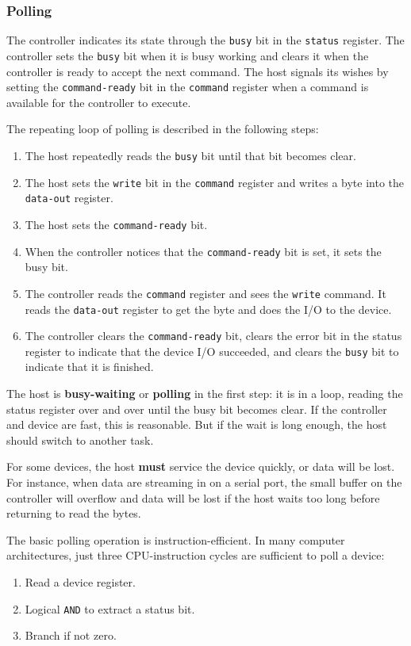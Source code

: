 \subsubsection{Polling}\label{subsubsec:Polling}
The controller indicates its state through the \texttt{busy} bit in the \texttt{status} register.
The controller sets the \texttt{busy} bit when it is busy working and clears it when the controller is ready to accept the next command.
The host signals its wishes by setting the \texttt{command-ready} bit in the \texttt{command} register when a command is available for the controller to execute.

The repeating loop of polling is described in the following steps:
\begin{enumerate}[noitemsep]
\item The host repeatedly reads the \texttt{busy} bit until that bit becomes clear.
\item The host sets the \texttt{write} bit in the \texttt{command} register and writes a byte into the \texttt{data-out} register.
\item The host sets the \texttt{command-ready} bit.
\item When the controller notices that the \texttt{command-ready} bit is set, it sets the busy bit.
\item The controller reads the \texttt{command} register and sees the \texttt{write} command.
  It reads the \texttt{data-out} register to get the byte and does the I/O to the device.
\item The controller clears the \texttt{command-ready} bit, clears the error bit in the status register to indicate that the device I/O succeeded, and clears the \texttt{busy} bit to indicate that it is finished.
\end{enumerate}

The host is \textbf{busy-waiting} or \textbf{polling} in the first step: it is in a loop, reading the status register over and over until the busy bit becomes clear.
If the controller and device are fast, this is reasonable.
But if the wait is long enough, the host should switch to another task.

For some devices, the host \textbf{must} service the device quickly, or data will be lost.
For instance, when data are streaming in on a serial port, the small buffer on the controller will overflow and data will be lost if the host waits too long before returning to read the bytes.

The basic polling operation is instruction-efficient.
In many computer architectures, just three CPU-instruction cycles are sufficient to poll a device:
\begin{enumerate}[noitemsep]
\item Read a device register.
\item Logical \texttt{AND} to extract a status bit.
\item Branch if not zero.
\end{enumerate}

